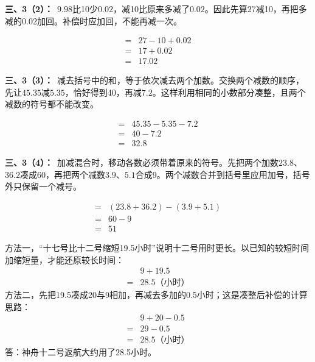 \documentclass[multi=snippet,border=0pt]{standalone}
\newenvironment{snippet}[3]{\begin{minipage}{#1bp}\color{answerred}\fontsize{#2}{#3}\selectfont\raggedright}{\end{minipage}}
\begin{document}
\begin{snippet}{505}{11.5}{14}\textbf{三、3（2）：}\ \(9.98\)比10少\(0.02\)，减10比原来多减了\(0.02\)。因此先算27减10，再把多减的\(0.02\)加回。补偿时应加回，不能再减一次。\end{snippet}
\begin{snippet}{232.0}{10.5}{12.8}\[\begin{aligned}={}&27-10+0.02\\={}&17+0.02\\={}&17.02\end{aligned}\]\end{snippet}
\begin{snippet}{505}{11.5}{14}\textbf{三、3（3）：}\ 减去括号中的和，等于依次减去两个加数。交换两个减数的顺序，先让\(45.35\)减\(5.35\)，恰好得到40，再减\(7.2\)。这样利用相同的小数部分凑整，且两个减数的符号都不能改变。\end{snippet}
\begin{snippet}{208.00000000000003}{10.5}{12.8}\[\begin{aligned}={}&45.35-5.35-7.2\\={}&40-7.2\\={}&32.8\end{aligned}\]\end{snippet}
\begin{snippet}{505}{11.5}{14}\textbf{三、3（4）：}\ 加减混合时，移动各数必须带着原来的符号。先把两个加数\(23.8\)、\(36.2\)凑成60，再把两个减数\(3.9\)、\(5.1\)合成9。两个减数合并到括号里应用加号，括号外只保留一个减号。\end{snippet}
\begin{snippet}{279.0}{10.5}{12.8}\[\begin{aligned}={}&(23.8+36.2)-(3.9+5.1)\\={}&60-9\\={}&51\end{aligned}\]\end{snippet}
\begin{snippet}{505}{11.5}{14}方法一，“十七号比十二号缩短19.5小时”说明十二号用时更长。以已知的较短时间加缩短量，才能还原较长时间：\[\begin{aligned}&9+19.5\\={}&28.5\text{（小时）}\end{aligned}\]方法二，先把19.5凑成20与9相加，再减去多加的0.5小时；这是凑整后补偿的计算思路：\[\begin{aligned}&9+20-0.5\\={}&29-0.5\\={}&28.5\text{（小时）}\end{aligned}\]答：神舟十二号返航大约用了28.5小时。\end{snippet}
\end{document}
